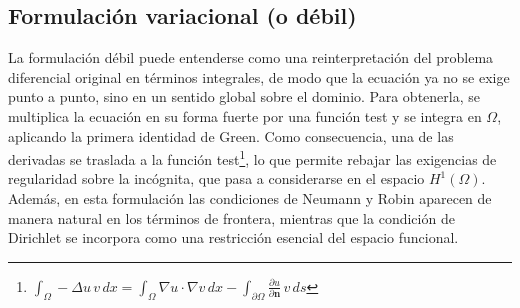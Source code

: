 \documentclass[11pt]{book}
\theoremstyle{plain} %
\theoremstyle{definition} %
\theoremstyle{definition} %
\begin{document}




\vspace{-0.2cm}



\subsection{Formulación variacional (o débil)}\label{sec:Debil}

La formulación débil puede entenderse como una reinterpretación del problema diferencial original 
en términos integrales, de modo que la ecuación ya no se exige punto a punto, sino en un sentido global 
sobre el dominio. Para obtenerla, se multiplica la ecuación en su forma fuerte por una función test y se 
integra en $\Omega$, aplicando la primera identidad de Green. Como consecuencia, una de las derivadas se traslada 
a la función test\footnote{$ \int_{\Omega} -\Delta u \, v \, dx = \int_{\Omega} \nabla u \cdot \nabla v \, dx - \int_{\partial\Omega} \frac{\partial u}{\partial \mathbf{n}} \, v \, ds $}, 
lo que permite rebajar las exigencias de regularidad sobre la incógnita, 
que pasa a considerarse en el espacio $H^1(\Omega)$. Además, en esta formulación las condiciones de 
Neumann y Robin aparecen de manera natural en los términos de frontera, mientras que la condición de 
Dirichlet se incorpora como una restricción esencial del espacio funcional.
\end{document}

